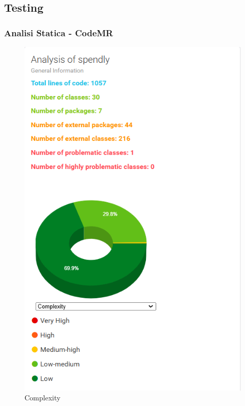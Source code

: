 \subsection{Testing}
\subsubsection{Analisi Statica - CodeMR}

\begin{figure}[H]
    \centering
    \begin{minipage}{0.45\textwidth}
        \centering
        \includegraphics[width=\textwidth]{images/Complexity_iter2.png}
        \caption{Complexity}
        \label{fig:Complexity_iterazione2}

\end{minipage}
\end{figure}
